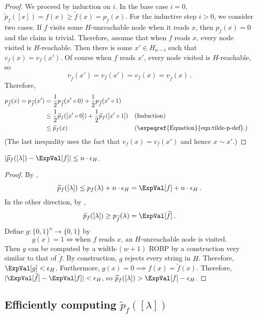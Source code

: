 \begin{proof}
We proceed by induction on $i$. In the base case $i = 0$, $\widetilde{p}_f([x]) = f(x) \geq \widetilde{f}(x) = p_{\widetilde{f}}(x)$. For the inductive step $i > 0$, we consider two cases. If $f$ visits some $H$-unreachable node when it reads $x$, then $p_{\widetilde{f}}(x) = 0$ and the claim is trivial. Therefore, assume that when $f$ reads $x$, every node visited is $H$-reachable. Then there is some $x' \in H_{n - i}$ such that $v_f(x) = v_f(x')$. Of course when $f$ reads $x'$, every node visited is $H$-reachable, so
$$
v_{\widetilde{f}}(x') = v_f(x') = v_f(x) = v_{\widetilde{f}}(x)\,.
$$
Therefore,
\begin{align*}
p_{\widetilde{f}}(x) = p_{\widetilde{f}}(x') &= \frac{1}{2} p_{\widetilde{f}}(x' \circ 0) + \frac{1}{2} p_{\widetilde{f}}(x' \circ 1) \\
&\leq \frac{1}{2} \widetilde{p}_f([x' \circ 0]) + \frac{1}{2} \widetilde{p}_f([x' \circ 1]) && \text{(Induction)} \\
&\leq \widetilde{p}_f(x) && (\text{\expeqref{Equation}{eqn:tilde-p-def}.})
\end{align*}
(The last inequality uses the fact that $v_f(x) = v_f(x')$ and hence $x \sim x'$.)
\end{proof}

\begin{corollary} \label{cor:tilde-p-error}
$|\widetilde{p}_f([\lambda]) - \ExpVal[f]| \leq n \cdot \epsilon_H$.
\end{corollary}

\begin{proof}
By ,
$$
\widetilde{p}_f([\lambda]) \leq p_f(\lambda) + n \cdot \epsilon_H = \ExpVal[f] + n \cdot \epsilon_H\,.
$$
In the other direction, by ,
$$
\widetilde{p}_f([\lambda]) \geq p_{\widetilde{f}}(\lambda) = \ExpVal[\widetilde{f}]\,.
$$
Define $g \colon \{0, 1\}^n \to \{0, 1\}$ by
$$
g(x) = 1 \iff \text{when $f$ reads $x$, an $H$-unreachable node is visited}.
$$
Then $g$ can be computed by a width-$(w + 1)$ ROBP by a construction very similar to that of $\widetilde{f}$. By construction, $g$ rejects every string in $H$. Therefore, $\ExpVal[g] < \epsilon_H$. Furthermore, $g(x) = 0 \implies f(x) = \widetilde{f}(x)$. Therefore, $|\ExpVal[\widetilde{f}] - \ExpVal[f]| < \epsilon_H$, so $\widetilde{p}_f([\lambda]) > \ExpVal[f] - \epsilon_H$.
\end{proof}


\subsection{Efficiently computing $\widetilde{p}_f([\lambda])$} \label{sec:const-width-efficiency}

